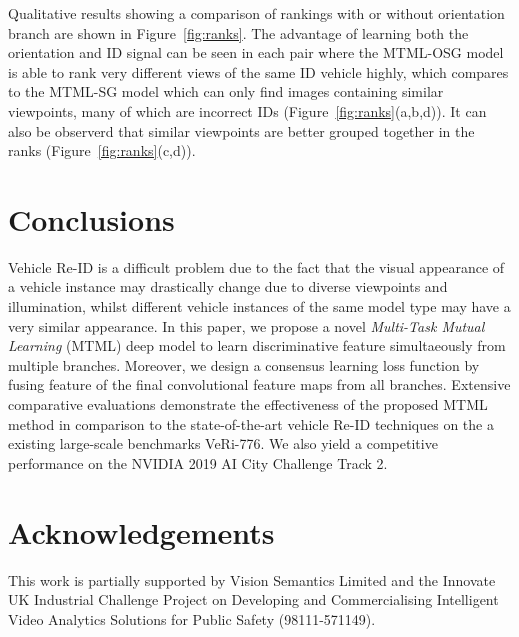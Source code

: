 \documentclass[10pt,twocolumn,letterpaper]{article}
\begin{document}

Qualitative results showing a comparison of rankings with or without orientation branch are shown in Figure~\ref{fig:ranks}. The advantage of learning both the orientation and ID signal can
be seen in each pair where the MTML-OSG model is able to rank very different views of the same ID vehicle highly, which compares to the MTML-SG model which can only find images containing similar viewpoints, many of which are incorrect IDs (Figure~\ref{fig:ranks}(a,b,d)). It can also be observerd that similar viewpoints are better grouped together in the ranks (Figure~\ref{fig:ranks}(c,d)).




%

\section{Conclusions}
Vehicle Re-ID is a difficult problem due to the fact that the visual appearance of
a vehicle instance may drastically change due to diverse
viewpoints and illumination, whilst different vehicle instances of the same
model type may have a very similar appearance.
%
In this paper, we propose a novel {\em Multi-Task Mutual Learning} (MTML) deep model
to learn discriminative feature simultaeously from multiple branches.
%
Moreover, we design a consensus learning loss function by fusing feature of the final convolutional feature maps from all branches.
%
Extensive comparative evaluations demonstrate the effectiveness of the
proposed MTML method in comparison to the state-of-the-art vehicle Re-ID techniques on the a existing large-scale benchmarks VeRi-776.
We also yield a competitive performance on the NVIDIA 2019 AI City Challenge Track 2.

\section{Acknowledgements}

This work is partially supported by Vision Semantics Limited and the
Innovate UK Industrial Challenge Project on Developing and Commercialising
Intelligent Video Analytics Solutions for Public Safety (98111-571149).

{\small


}
\end{document}
